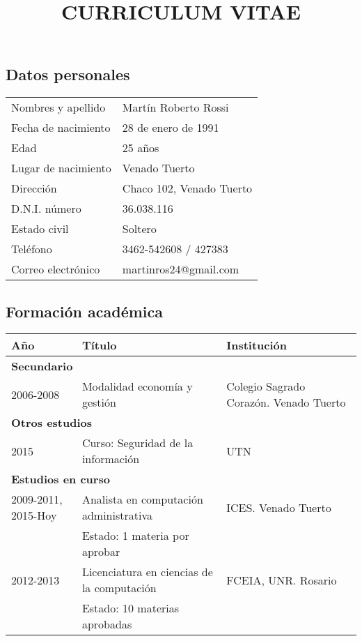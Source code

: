 \documentclass[10pt]{article}
\title{\textbf{CURRICULUM VITAE}}
\date{}
\begin{document}
\maketitle
\subsection*{Datos personales}
\bgroup
\def\arraystretch{1.25}
\begin{tabular}{p{5cm} l}
  Nombres y apellido&Martín Roberto Rossi\\
  Fecha de nacimiento&28 de enero de 1991\\
  Edad&25 años\\
  Lugar de nacimiento&Venado Tuerto\\
  Dirección&Chaco 102, Venado Tuerto\\
  D.N.I. número&36.038.116\\
  Estado civil&Soltero\\
  Teléfono&3462-542608 / 427383\\
  Correo electrónico&martinros24@gmail.com\\
\end{tabular}
\subsection*{Formación académica}
{\centering
  \begin{tabular}{|p{4cm}|p{7cm}|p{4cm}|}
    \hline
    \textbf{Año}&\textbf{Título}&\textbf{Institución}\\ \hline
    \multicolumn{3}{|l|}{\textbf{Secundario}}\\ \hline
    2006-2008&Modalidad economía y gestión&Colegio Sagrado Corazón. Venado Tuerto\\ \hline
    \multicolumn{3}{|l|}{\textbf{Otros estudios}}\\ \hline
    2015&Curso: Seguridad de la información&UTN\\ \hline
    \multicolumn{3}{|l|}{\textbf{Estudios en curso}}\\ \hline
    2009-2011, 2015-Hoy&Analista en computación administrativa&ICES. Venado Tuerto\\
             &Estado: 1 materia por aprobar&\\ \hline
    2012-2013&Licenciatura en ciencias de la computación&FCEIA, UNR. Rosario\\
                   &Estado: 10 materias aprobadas&\\ \hline
    \end{tabular}
}
\end{document}
